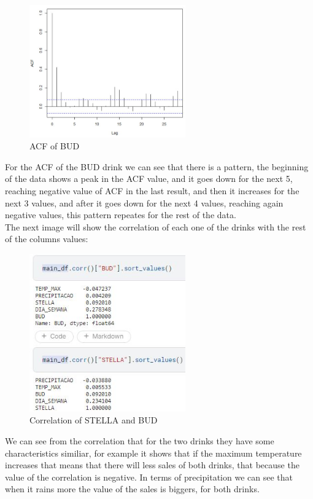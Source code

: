     \begin{figure}[H]
            \centering
            \includegraphics[width=0.6\textwidth]{assets/ACF BUD.jpeg}
            \caption{ACF of BUD}
            \label{fig:stella_outliers}
            \end{figure}


For the ACF of the BUD drink we can see that there is a pattern, the beginning of the data shows a peak in the ACF value, and it goes down for the next 5, reaching negative value of ACF in the last result, and then it increases for the next 3 values, and after it goes down for the next 4 values, reaching again negative values, this pattern repeates for the rest of the data.\\


The next image will show the correlation of each one of the drinks with the rest of the columns values:\\

\begin{figure}[H]
    \centering
    \includegraphics[width=0.6\textwidth]{assets/autocorrelação.jpeg}
    \caption{Correlation of STELLA and BUD}
    \label{fig:stella_outliers}
    \end{figure}


We can see from the correlation that for the two drinks they have some characteristics similiar, for example it shows that if the maximum temperature increases that means that there will less sales of both drinks, that because the value of the correlation is negative. In terms of precipitation we can see that when it rains more the value of the sales is biggers, for both drinks.